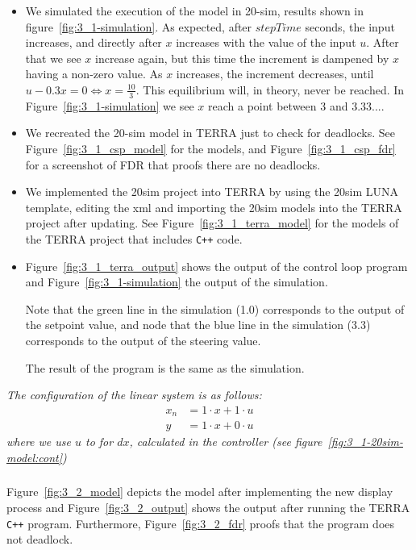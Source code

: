 \documentclass[a4paper,twoside,11pt]{article}
\newcommand{\cpp}{{\tt C++} }
\begin{document}
\subsubsection{}
\begin{itemize}
	\item We simulated the execution of the model in 20-sim, results shown in figure~\ref{fig:3_1-simulation}.
		As expected, after $stepTime$ seconds, the input increases, and directly after $x$ increases with the value of the input $u$.
		After that we see $x$ increase again, but this time the increment is dampened by $x$ having a non-zero value.
		As $x$ increases, the increment decreases, until $u - 0.3x = 0 \Leftrightarrow x=\frac{10}{3}$.
		This equilibrium will, in theory, never be reached.
		In Figure~\ref{fig:3_1-simulation} we see $x$ reach a point between $3$ and $3.33...$.

	\item We recreated the 20-sim model in TERRA just to check for deadlocks.
		See Figure~\ref{fig:3_1_csp_model} for the models, and Figure~\ref{fig:3_1_csp_fdr} for a screenshot of FDR that proofs there are no deadlocks.

	\item We implemented the 20sim project into TERRA by using the 20sim LUNA template, editing the xml and importing 
		the 20sim models into the TERRA project after updating.
		See Figure~\ref{fig:3_1_terra_model} for the models of the TERRA project that includes \cpp code.
	\item Figure~\ref{fig:3_1_terra_output} shows the output of the control 
		loop program and Figure~\ref{fig:3_1-simulation} the output of the simulation.

		Note that the green line in the simulation (1.0) corresponds to the output of the setpoint value, and
		node that the blue line in the simulation (3.3) corresponds to the output of the steering value.

		The result of the program is the same as the simulation.
\end{itemize}
\textit{The configuration of the linear system is as follows:
\begin{align}
 x_n &= 1\cdot x+1 \cdot u\nonumber\\
 y   &= 1\cdot x+0 \cdot u\nonumber
\end{align}
where we use $u$ to for $dx$, calculated in the controller (see figure~\ref{fig:3_1-20sim-model:cont})}
\subsubsection{}
Figure~\ref{fig:3_2_model} depicts the model after implementing the new display 
process and Figure~\ref{fig:3_2_output} shows the output after running the TERRA 
\cpp program. Furthermore, Figure~\ref{fig:3_2_fdr} proofs that the program does not
deadlock.
\end{document}
